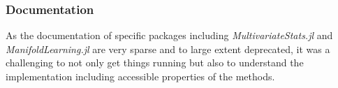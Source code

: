 \documentclass[journal, a4paper]{IEEEtran}
\begin{document}
\subsubsection{Documentation}
As the documentation of specific packages including \textit{MultivariateStats.jl} and \textit{ManifoldLearning.jl} are very sparse and to large extent deprecated, it was a challenging to not only get things running but also to understand the implementation including accessible properties of the methods.\\



%
%
%
%
%
%
%
%
%
%
%
%
%
\end{document}
